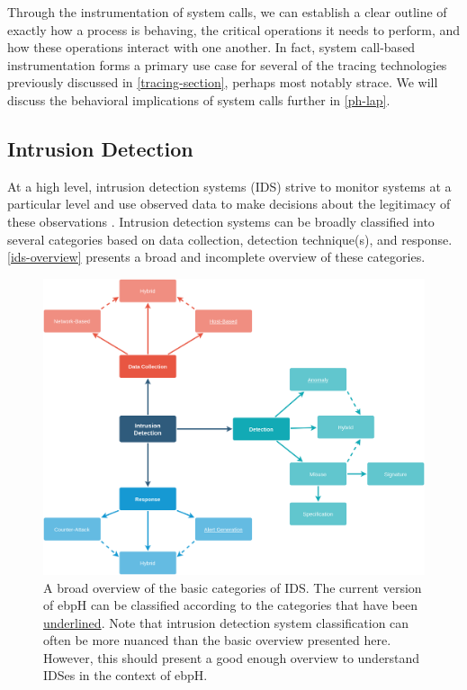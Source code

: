 \documentclass[
  12pt]{findlay}
\begin{document}
Through the instrumentation of system calls, we can establish a clear
outline of exactly how a process is behaving, the critical operations it
needs to perform, and how these operations interact with one another. In
fact, system call-based instrumentation forms a primary use case for
several of the tracing technologies previously discussed in
\autoref{tracing-section}, perhaps most notably strace. We will discuss
the behavioral implications of system calls further in \autoref{ph-lap}.

\hypertarget{intrusion-detection}{%
\subsection{Intrusion Detection}\label{intrusion-detection}}

At a high level, intrusion detection systems (IDS) strive to monitor
systems at a particular level and use observed data to make decisions
about the legitimacy of these observations \autocite{kemmerer02}.
Intrusion detection systems can be broadly classified into several
categories based on data collection, detection technique(s), and
response. \autoref{ids-overview} presents a broad and incomplete
overview of these categories.

\begin{figure}[p]
    \caption[An overview of the basic categories of IDS]{
        A broad overview of the basic categories of IDS.
        The current version of ebpH can be classified according to the
        categories that have been \underline{underlined}. Note that intrusion detection
        system classification can often be more nuanced than the basic overview presented
        here. However, this should present a good enough overview to understand IDSes in
        the context of ebpH.
    }
    \label{ids-overview}
    \includegraphics{../figures/ids-overview.png}
\end{figure}
\end{document}
